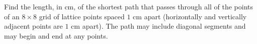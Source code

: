 Find the length, in cm, of the shortest path that passes through all of the points of an $8\times8$ grid of lattice points spaced $1$ cm apart (horizontally and vertically adjacent points are $1$ cm apart). The path may include diagonal segments and may begin and end at any points.
